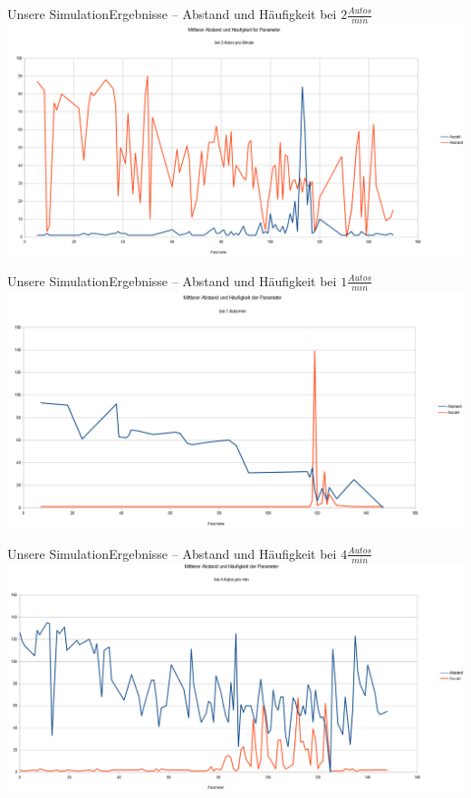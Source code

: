 \documentclass[11pt]{beamer}
\begin{document}
\begin{frame}{Unsere Simulation}{Ergebnisse -- Abstand und Häufigkeit bei $2\frac{Autos}{min}$}
	\includegraphics[width=\textwidth]{ma_1.PNG}
\end{frame}

\begin{frame}{Unsere Simulation}{Ergebnisse -- Abstand und Häufigkeit bei $1\frac{Autos}{min}$}
	\includegraphics[width=\textwidth]{ma_2.PNG}
\end{frame}

\begin{frame}{Unsere Simulation}{Ergebnisse -- Abstand und Häufigkeit bei $4\frac{Autos}{min}$}
	\includegraphics[width=\textwidth]{ma_3.PNG}
\end{frame}
\end{document}
